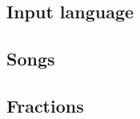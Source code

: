 \documentclass[a4paper]{article}
\begin{document}
\begin{appendices}

\section{Input language}
\label{input}
\subsection{Songs}
\label{input_songs}
\subsection{Fractions}
\label{input_fractions}

\end{appendices}
\end{document}
